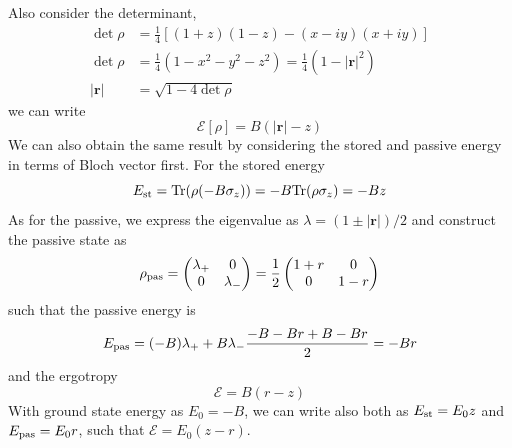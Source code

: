 \documentclass[../../../main.tex]{subfiles}
\begin{document}
Also consider the determinant,
\begin{align*}
  \det\rho     & =  \frac14\left[(1+z)(1-z)-(x-iy)(x+iy)\right]        \\
  \det\rho     & =  \frac14(1-x^2-y^2-z^2) = \frac14(1-|\mathbf{r}|^2) \\
  |\mathbf{r}| & =  \sqrt{1-4\det\rho}
\end{align*}
we can write
\begin{equation*}
  \mathcal{E}[\rho] = B(|\mathbf{r}|-z)
\end{equation*}
We can also obtain the same result by considering the stored and passive energy in terms of Bloch vector first.
For the stored energy
\begin{equation*}
  E_{\rm st} = \mathrm{Tr}(\rho(-B\sigma_z)) = -B\mathrm{Tr}(\rho\sigma_z)  = -Bz
\end{equation*}
As for the passive, we express the eigenvalue as $\lambda = (1\pm |\mathbf{r}|)/2$ and construct the passive state as
\begin{equation*}
  \rho_{\rm pas} = \begin{pmatrix} \lambda_+&0\\ 0&\lambda_- \end{pmatrix} = \frac12 \begin{pmatrix} 1+r&0\\ 0&1-r \end{pmatrix}
\end{equation*}
such that the passive energy is
\begin{equation*}
  E_{\rm pas}
  = (-B)\lambda_+ + B\lambda_-
  \frac{-B-Br+B-Br}{2} =-Br
\end{equation*}
and the ergotropy
\begin{equation*}
  \mathcal{E} = B(r-z)
\end{equation*}
With ground state energy as $E_0 = -B$, we can write also both as $ E_{\rm st}=E_0z$ and  $E_{\rm pas}=E_0r$, such that $\mathcal{E} = E_0(z-r)$.
\end{document}
